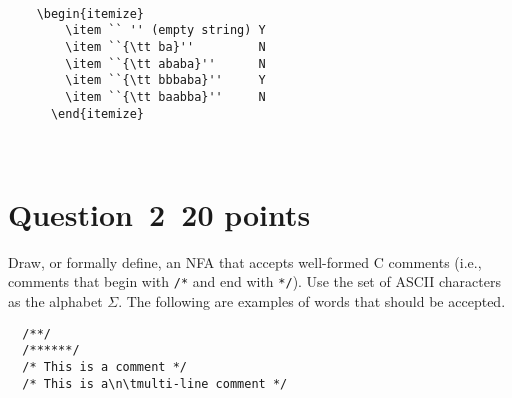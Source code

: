 \documentclass[10pt]{article}
\begin{document}
\begin{Verbatim}[frame=single]

	\begin{itemize}
		\item `` '' (empty string) Y
		\item ``{\tt ba}''         N
		\item ``{\tt ababa}''      N
		\item ``{\tt bbbaba}''     Y
		\item ``{\tt baabba}''     N
	  \end{itemize}



\end{Verbatim}
\section*{Question~2~\hfill 20 points}

Draw, or formally define, 
an NFA that accepts well-formed C comments
(i.e., comments that begin with \verb|/*|
and end with \verb|*/|).
Use the set of ASCII characters as the alphabet $\Sigma$.
The following are examples of words that should be accepted.
\begin{verbatim}
  /**/
  /******/
  /* This is a comment */
  /* This is a\n\tmulti-line comment */
\end{verbatim}

\begin{center}
\end{center}
\end{document}

